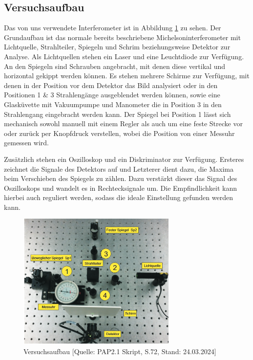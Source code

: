 \documentclass{article}
\begin{document}
\newpage
\subsection{Versuchsaufbau}

Das von uns verwendete Interferometer ist in Abbildung \ref{fig:Aufbau} zu sehen. Der Grundaufbau ist das normale bereits beschriebene Michelsoninterferometer mit Lichtquelle, Strahlteiler, Spiegeln und Schrim beziehungsweise Detektor zur Analyse. Als Lichtquellen stehen ein Laser und eine Leuchtdiode zur Verfügung. An den Spiegeln sind Schrauben angebracht, mit denen diese vertikal und horizontal gekippt werden können. Es stehen mehrere Schirme zur Verfügung, mit denen in der Position vor dem Detektor das Bild analysiert oder in den Positionen 1 \& 3 Strahlengänge ausgeblendet werden können, sowie eine Glasküvette mit Vakuumpumpe und Manometer die in Position 3 in den Strahlengang eingebracht werden kann. 
Der Spiegel bei Position 1 lässt sich mechanisch sowohl manuell mit einem Regler als auch um eine feste Strecke vor oder zurück per Knopfdruck verstellen, wobei die Position von einer Messuhr gemessen wird. 

Zusätzlich stehen ein Oszilloskop und ein Diskriminator zur Verfügung. Ersteres zeichnet die Signale des Detektors auf und Letzterer dient dazu, die Maxima beim Verschieben des Spiegels zu zählen. Dazu verstärkt dieser das Signal des Oszilloskops und wandelt es in Rechtecksignale um. Die Empfindlichkeit kann hierbei auch reguliert werden, sodass die ideale Einstellung gefunden werden kann. 


\begin{figure}[!b]
    \centering
    \includegraphics[width=0.7\textwidth]{graphics/skript/aufbau.png}
    \caption{Versuchsaufbau [Quelle: PAP2.1 Skript, S.72, Stand: 24.03.2024]}
    \label{fig:Aufbau}
\end{figure}
\end{document}
